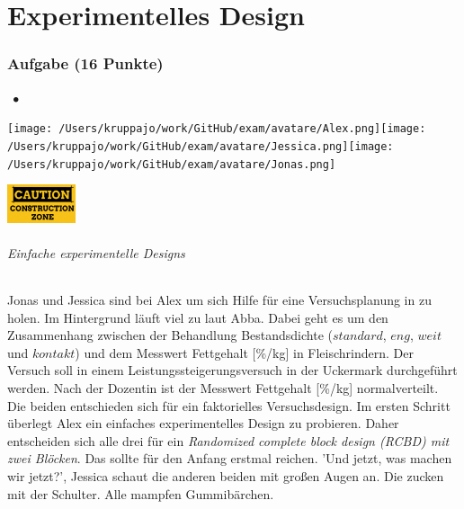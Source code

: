 \documentclass[a4paper, 9pt]{scrartcl}\usepackage[]{graphicx}\usepackage[]{xcolor}
\begin{document}
\part{Experimentelles Design}

\section{Aufgabe \hfill (16 Punkte)}


 
\ifcollection
\begin{flushright}
\tiny\vspace{-3Ex}
\textbf{\examinhaltstart}
\exammodulestatversuch $\;\bullet$
\exammodulebiostat
\vspace{-4Ex}
\end{flushright}
\begin{minipage}[t]{0.5\textwidth}
\texttt{[image: /Users/kruppajo/work/GitHub/exam/avatare/Alex.png]}\hspace{-4mm}\texttt{[image: /Users/kruppajo/work/GitHub/exam/avatare/Jessica.png]}\hspace{-4mm}\texttt{[image: /Users/kruppajo/work/GitHub/exam/avatare/Jonas.png]}
\end{minipage}
\begin{minipage}[t]{0.5\textwidth}
\hfill
\href{https://youtu.be/wJqsNV1hOW8}{\includegraphics[width = 2cm]{img/caution}}
\end{minipage}
\fi



\ifcollection
\paragraph{Einfache experimentelle Designs}
\fi

Jonas und Jessica sind bei Alex um sich Hilfe für eine Versuchsplanung in \Rlogo zu holen. Im Hintergrund läuft viel zu laut Abba. Dabei geht es um den Zusammenhang zwischen der Behandlung Bestandsdichte ($standard$, $eng$, $weit$ und $kontakt$) und dem Messwert Fettgehalt [\%/kg] in Fleischrindern. Der Versuch soll in einem Leistungssteigerungsversuch in der Uckermark durchgeführt werden. Nach der Dozentin ist der Messwert Fettgehalt [\%/kg] normalverteilt. Die beiden entschieden sich für ein faktorielles Versuchsdesign. Im ersten Schritt überlegt Alex ein einfaches experimentelles Design zu probieren. Daher entscheiden sich alle drei für ein \textit{Randomized complete block design (RCBD) mit zwei Blöcken}. Das sollte für den Anfang erstmal reichen. 'Und jetzt, was machen wir jetzt?', Jessica schaut die anderen beiden mit großen Augen an. Die zucken mit der Schulter. Alle mampfen Gummibärchen.\\
\end{document}
